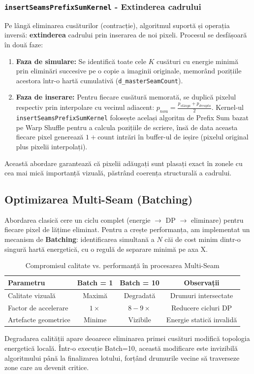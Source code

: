 \documentclass[12pt,a4paper]{article}
\begin{document}
\subsubsection{\texttt{insertSeamsPrefixSumKernel} - Extinderea cadrului}
Pe lângă eliminarea cusăturilor (contracție), algoritmul suportă și operația inversă: \textbf{extinderea} cadrului prin inserarea de noi pixeli. Procesul se desfășoară în două faze:
\begin{enumerate}[noitemsep]
    \item \textbf{Faza de simulare:} Se identifică toate cele $K$ cusături cu energie minimă prin eliminări succesive pe o copie a imaginii originale, memorând pozițiile acestora într-o hartă cumulativă (\texttt{d\_masterSeamCount}).
    \item \textbf{Faza de inserare:} Pentru fiecare cusătură memorată, se duplică pixelul respectiv prin interpolare cu vecinul adiacent: $p_{nou} = \frac{p_{stânga} + p_{dreapta}}{2}$. \newline
Kernel-ul \texttt{insertSeamsPrefixSumKernel} folosește același algoritm de Prefix Sum bazat pe Warp Shuffle pentru a calcula pozițiile de scriere, însă de data aceasta fiecare pixel generează $1 + \text{count}$ intrări în buffer-ul de ieșire (pixelul original plus pixelii interpolați).
\end{enumerate}
Această abordare garantează că pixelii adăugați sunt plasați exact în zonele cu cea mai mică importanță vizuală, păstrând coerența structurală a cadrului.
\subsection{Optimizarea Multi-Seam (Batching)}
Abordarea clasică cere un ciclu complet (energie $\to$ DP $\to$ eliminare) pentru fiecare pixel de lățime eliminat. Pentru a crește performanța, am implementat un mecanism de \textbf{Batching}: identificarea simultană a $N$ căi de cost minim dintr-o singură hartă energetică, cu o regulă de separare minimă pe axa X.
\begin{table}[H]
\centering
\begin{tabular}{lccc}
\toprule
\textbf{Parametru} & \textbf{Batch = 1} & \textbf{Batch = 10} & \textbf{Observații} \\
\midrule
Calitate vizuală & Maximă & Degradată & Drumuri intersectate \\
Factor de accelerare & $1\times$ & $8{-}9\times$ & Reducere cicluri DP \\
Artefacte geometrice & Minime & Vizibile & Energie statică invalidă \\
\bottomrule
\end{tabular}
\caption{Compromisul calitate vs. performanță în procesarea Multi-Seam}
\end{table}
Degradarea calității apare deoarece eliminarea primei cusături modifică topologia energetică locală. Într-o execuție Batch=10, această modificare este invizibilă algoritmului până la finalizarea lotului, forțând drumurile vecine să traverseze zone care au devenit critice.
\end{document}
